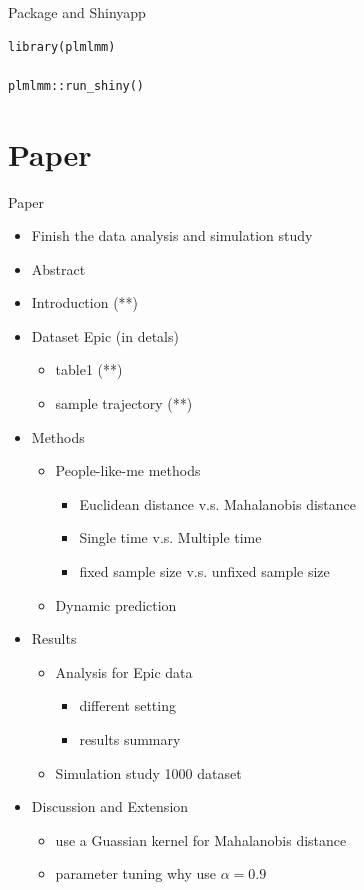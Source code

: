 \documentclass[
  8pt,
  ignorenonframetext,
]{beamer}
\providecommand{\tightlist}{%
  \setlength{\itemsep}{0pt}\setlength{\parskip}{0pt}}
\begin{document}
\begin{frame}[fragile]{Package and Shinyapp}
\protect\hypertarget{package-and-shinyapp}{}
\begin{verbatim}
library(plmlmm)

plmlmm::run_shiny()
\end{verbatim}
\end{frame}

\hypertarget{paper}{%
\section{Paper}\label{paper}}

\begin{frame}{Paper}
\begin{itemize}
\item
  Finish the data analysis and simulation study
\item
  Abstract
\item
  Introduction (**)
\item
  Dataset Epic (in detals)

  \begin{itemize}
  \item
    table1 (**)
  \item
    sample trajectory (**)
  \end{itemize}
\item
  Methods

  \begin{itemize}
  \tightlist
  \item
    People-like-me methods

    \begin{itemize}
    \tightlist
    \item
      Euclidean distance v.s. Mahalanobis distance
    \item
      Single time v.s. Multiple time
    \item
      fixed sample size v.s. unfixed sample size
    \end{itemize}
  \item
    Dynamic prediction
  \end{itemize}
\item
  Results

  \begin{itemize}
  \tightlist
  \item
    Analysis for Epic data

    \begin{itemize}
    \tightlist
    \item
      different setting
    \item
      results summary
    \end{itemize}
  \item
    Simulation study 1000 dataset
  \end{itemize}
\item
  Discussion and Extension

  \begin{itemize}
  \tightlist
  \item
    use a Guassian kernel for Mahalanobis distance
  \item
    parameter tuning why use \(\alpha = 0.9\)
  \end{itemize}
\end{itemize}
\end{frame}
\end{document}
